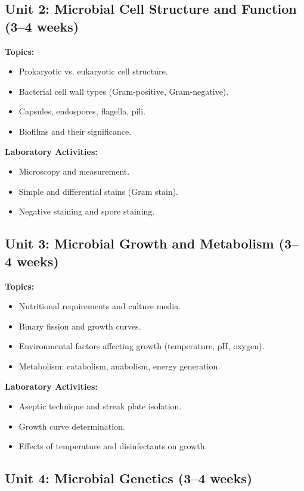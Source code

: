 \documentclass[12pt,oneside]{book}
\begin{document}
\subsection{Unit 2: Microbial Cell Structure and Function (3--4 weeks)}

\textbf{Topics:}
\begin{itemize}
    \item Prokaryotic vs. eukaryotic cell structure.
    \item Bacterial cell wall types (Gram-positive, Gram-negative).
    \item Capsules, endospores, flagella, pili.
    \item Biofilms and their significance.
\end{itemize}

\textbf{Laboratory Activities:}
\begin{itemize}
    \item Microscopy and measurement.
    \item Simple and differential stains (Gram stain).
    \item Negative staining and spore staining.
\end{itemize}

\subsection{Unit 3: Microbial Growth and Metabolism (3--4 weeks)}

\textbf{Topics:}
\begin{itemize}
    \item Nutritional requirements and culture media.
    \item Binary fission and growth curves.
    \item Environmental factors affecting growth (temperature, pH, oxygen).
    \item Metabolism: catabolism, anabolism, energy generation.
\end{itemize}

\textbf{Laboratory Activities:}
\begin{itemize}
    \item Aseptic technique and streak plate isolation.
    \item Growth curve determination.
    \item Effects of temperature and disinfectants on growth.
\end{itemize}

\subsection{Unit 4: Microbial Genetics (3--4 weeks)}
\end{document}
